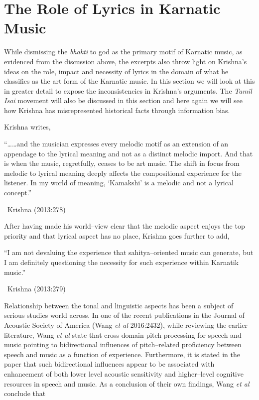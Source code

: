 \vspace{-.3cm}

\section*{The Role of Lyrics in Karnatic Music }

\vspace{-.2cm}

While dismissing the \textit{bhakti} to god as the primary motif of Karnatic music, as evidenced from the discussion above, the excerpts also throw light on Krishna’s ideas on the role, impact and necessity of lyrics in the domain of what he classifies as the art form of the Karnatic music. In this section we will look at this in greater detail to expose the inconsistencies in Krishna’s arguments. The \textit{Tamil Isai} movement will also be discussed in this section and here again we will see how Krishna has misrepresented historical facts through information bias.

Krishna writes,

\begin{myquote}
“……and the musician expresses every melodic motif as an extension of an appendage to the lyrical meaning and not as a distinct melodic import. And that is when the music, regretfully, ceases to be art music. The shift in focus from melodic to lyrical meaning deeply affects the compositional experience for the listener. In my world of meaning, ‘Kamakshi’ is a melodic and not a lyrical concept.” 

~\hfill Krishna (2013:278)
\end{myquote}

After having made his world–view clear that the melodic aspect enjoys the top priority and that lyrical aspect has no place, Krishna goes further to add,

\begin{myquote}
“I am not devaluing the experience that sahitya–oriented music can generate, but I am definitely questioning the necessity for such experience within Karnatik music.” 

~\hfill Krishna (2013:279)
\end{myquote}

Relationship between the tonal and linguistic aspects has been a subject of serious studies world across. In one of the recent publications in the Journal of Acoustic Society of America (Wang \textit{et al} 2016:2432), while reviewing the earlier literature, Wang \textit{et al} state that cross domain pitch processing for speech and music pointing to bidirectional influences of pitch–related proficiency between speech and music as a function of experience. Furthermore, it is stated in the paper that such bidirectional influences appear to be associated with enhancement of both lower level acoustic sensitivity and higher–level cognitive resources in speech and music. As a conclusion of their own findings, Wang \textit{et al} conclude that

